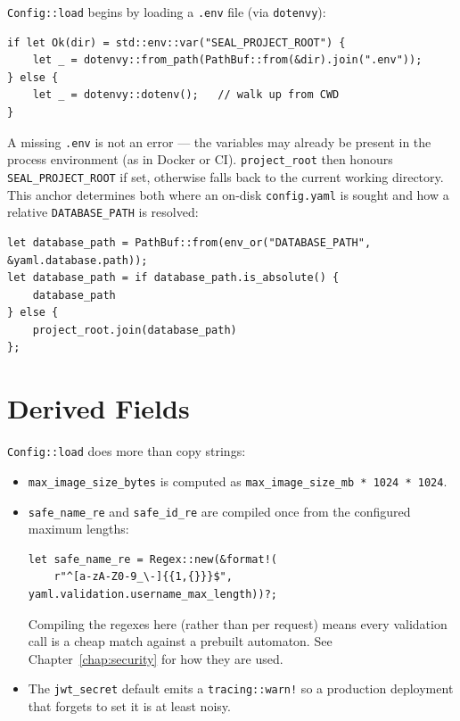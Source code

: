 \verb|Config::load| begins by loading a \verb|.env| file (via \verb|dotenvy|):

\begin{lstlisting}
if let Ok(dir) = std::env::var("SEAL_PROJECT_ROOT") {
    let _ = dotenvy::from_path(PathBuf::from(&dir).join(".env"));
} else {
    let _ = dotenvy::dotenv();   // walk up from CWD
}
\end{lstlisting}

A missing \verb|.env| is not an error --- the variables may already be present in
the process environment (as in Docker or CI). \verb|project_root| then honours
\verb|SEAL_PROJECT_ROOT| if set, otherwise falls back to the current working
directory. This anchor determines both where an on-disk \verb|config.yaml| is
sought and how a relative \verb|DATABASE_PATH| is resolved:

\begin{lstlisting}
let database_path = PathBuf::from(env_or("DATABASE_PATH", &yaml.database.path));
let database_path = if database_path.is_absolute() {
    database_path
} else {
    project_root.join(database_path)
};
\end{lstlisting}

\section{Derived Fields}

\verb|Config::load| does more than copy strings:

\begin{itemize}
  \item \verb|max_image_size_bytes| is computed as
        \verb|max_image_size_mb * 1024 * 1024|.
  \item \verb|safe_name_re| and \verb|safe_id_re| are compiled once from the
        configured maximum lengths:
\begin{lstlisting}
let safe_name_re = Regex::new(&format!(
    r"^[a-zA-Z0-9_\-]{{1,{}}}$", yaml.validation.username_max_length))?;
\end{lstlisting}
        Compiling the regexes here (rather than per request) means every
        validation call is a cheap match against a prebuilt automaton. See
        Chapter~\ref{chap:security} for how they are used.
  \item The \verb|jwt_secret| default emits a \verb|tracing::warn!| so a
        production deployment that forgets to set it is at least noisy.
\end{itemize}

